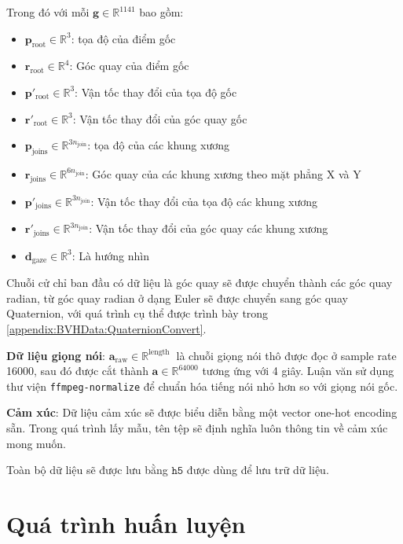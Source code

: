 Trong  đó với mỗi $\mathbf{g} \in \mathbb{R}^{1141}$ bao gồm:
{
	\begin{itemize}
		\item $\mathbf{p}_{\text{root}} \in \mathbb{R}^3$: tọa độ của điểm gốc
		\item $\mathbf{r}_{\text{root}} \in \mathbb{R}^4$: Góc quay của điểm gốc
		\item $\mathbf{p}'_{\text{root}} \in \mathbb{R}^3$: Vận tốc thay đổi của tọa độ gốc
		\item $\mathbf{r}'_{\text{root}} \in \mathbb{R}^3$: Vận tốc thay đổi của góc quay gốc
		
		\item $\mathbf{p}_{\text{joins}} \in \mathbb{R}^{3 n_{\text{join} }}$: tọa độ của các khung xương
		\item $\mathbf{r}_{\text{joins}} \in \mathbb{R}^{6 n_{\text{join} }}$: Góc quay của các khung xương theo mặt phẳng X và Y
		\item $\mathbf{p}'_{\text{joins}} \in \mathbb{R}^{3n_{\text{join} }}$: Vận tốc thay đổi của tọa độ các khung xương
		\item $\mathbf{r}'_{\text{joins}} \in \mathbb{R}^{3n_{\text{join} }}$: Vận tốc thay đổi của góc quay các khung xương
		\item $\mathbf{d}_{\text{gaze}} \in \mathbb{R}^3$: Là hướng nhìn
\end{itemize}}

Chuỗi cử chỉ ban đầu có dữ liệu là góc quay sẽ được chuyển thành các góc quay radian, từ góc quay radian ở dạng Euler sẽ được chuyển sang góc quay Quaternion, với quá trình cụ thể được trình bày trong \autoref{appendix:BVHData:QuaternionConvert}.

\textbf{Dữ liệu giọng nói}: $\mathbf{a}_{\text{raw}} \in \mathbb{R}^{ \text{length } }$ là chuỗi giọng nói thô được đọc ở sample rate 16000, sau đó được cắt thành $\mathbf{a} \in \mathbb{R}^{64000}$ tương ứng với 4 giây. Luận văn sử dụng thư viện \texttt{ffmpeg-normalize} để chuẩn hóa tiếng nói nhỏ hơn so với giọng nói gốc.

\textbf{Cảm xúc}: Dữ liệu cảm xúc sẽ được biểu diễn bằng một vector one-hot encoding sẵn. Trong quá trình lấy mẫu, tên tệp sẽ định nghĩa luôn thông tin về cảm xúc mong muốn.

Toàn bộ dữ liệu sẽ được lưu bằng $\texttt{h5}$ được dùng để lưu trữ dữ liệu.

\section{Quá trình huấn luyện}

